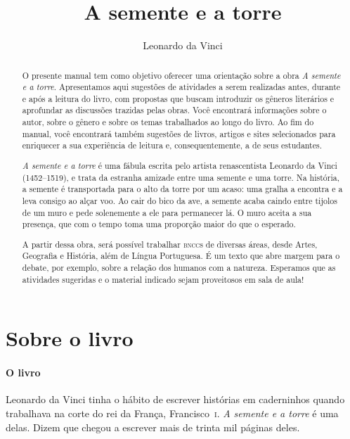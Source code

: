 \documentclass[11pt]{extarticle}
\newcommand{\AutorLivro}{Leonardo da Vinci}
\newcommand{\TituloLivro}{A semente e a torre}
\newcommand{\colaborador}{Ana Lancman}
\begin{document}
\title{\TituloLivro}
\author{\AutorLivro}
\def\authornotes{\colaborador}

\date{}
\maketitle

\tableofcontents


\begin{abstract}
O presente manual tem como objetivo oferecer uma orientação sobre a obra \textit{A semente e a torre}. Apresentamos aqui sugestões de atividades a serem realizadas antes, durante e após a leitura do livro, com propostas que buscam introduzir os gêneros literários e aprofundar as discussões trazidas pelas obras. Você encontrará informações sobre o autor, sobre o gênero e sobre os temas trabalhados ao longo do livro. Ao fim do manual, você encontrará também sugestões de livros, artigos e sites selecionados para enriquecer a sua experiência de leitura e, consequentemente, a de seus estudantes.

\textit{A semente e a torre} é uma fábula escrita pelo artista renascentista Leonardo da Vinci (1452--1519), e trata da estranha amizade entre uma semente e uma torre. Na história, a semente é transportada para o alto da torre por um acaso: uma gralha a encontra e a leva consigo ao alçar voo. Ao cair do bico da ave, a semente acaba caindo entre tijolos de um muro e pede solenemente a ele para permanecer lá. O muro aceita a sua presença, que com o tempo toma uma proporção maior do que o esperado. 

A partir dessa obra, será possível trabalhar \textsc{bncc}s de diversas áreas, desde Artes, Geografia e História, além de Língua Portuguesa. É um texto que abre margem para o debate, por exemplo, sobre a relação dos humanos com a natureza. Esperamos que as atividades sugeridas e o material indicado sejam proveitosos em sala de aula! 

\end{abstract}

\section{Sobre o livro}

\paragraph{O livro} Leonardo da Vinci tinha o hábito de escrever histórias em caderninhos quando trabalhava na corte do rei da França, Francisco~\textsc{i}. \textit{A semente e a torre} é uma delas. Dizem que chegou a escrever mais de trinta mil páginas deles. 
\end{document}
